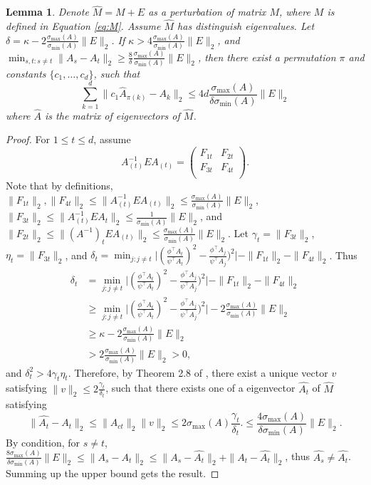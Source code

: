 \documentclass[english]{article} %
\providecommand{\lemmaname}{Lemma}
\providecommand{\lemmaname}{Lemma}
\theoremstyle{plain}
\theoremstyle{remark}
\theoremstyle{claim}
\theoremstyle{plain}
\newtheorem{lemma}[thm]{\protect\lemmaname}
\begin{document}
\begin{lemma}
\label{lem:eigenvectorvariation}
Denote $\widehat{M} = M+E$ as a perturbation of matrix $M$, where $M$ is defined in Equation \eqref{eq:M}. 
Assume $\widehat{M}$ has distinguish eigenvalues. Let $\delta = \kappa -  2 \frac{\sigma_{\max}(A)}{\sigma_{\min}(A)}\|E\|_2$. 
If $\kappa > 4 \frac{\sigma_{\max}(A)}{\sigma_{\min}(A)}\|E\|_2$, and $\min_{s,t:s\neq t} \|A_s - A_t\|_2 \ge \frac{8}{\delta}\frac{\sigma_{\max}(A)}{\sigma_{\min}(A) } \|E\|_2$, then there exist a permutation $\pi$ and constants $\{c_1,\ldots,c_d\}$, such that 
\[
\sum_{k=1}^{d}\| c_1\widehat{A}_{\pi(k)} - A_k\|_2 \le 4d  \frac{\sigma_{\max}(A)}{\delta \sigma_{\min}(A) } \|E\|_2
\]
where $\widehat{A}$ is the matrix of eigenvectors of $\widehat{M}$. 
\end{lemma}

\begin{proof}
For $1\le t\le d$, assume 
\[
A_{(t)}^{-1} E A_{(t)} =  
\left(
\begin{array}{cc}
F_{1t} & F_{2t}\\
F_{3t} & F_{4t} \\
\end{array} 
\right). 
\] 
Note that by definitions, $\|F_{1t}\|_2,\|F_{4t}\|_2\le\|A_{(t)}^{-1} E A_{(t)}\|_2\le\frac{\sigma_{\max}(A)}{\sigma_{\min}(A)}\|E\|_2$,
 $\|F_{3t}\|_2\le\|A_{(t)}^{-1}EA_{t}\|_2\le\frac{1}{\sigma_{\min}(A)}\|E\|_2$,
 and $\|F_{2t}\|_2\le\|(A^{-1})_tEA_{(t)}\|_2\le\frac{\sigma_{\max}(A)}{\sigma_{\min}(A)}\|E\|_2$.
Let $\gamma_t = \|F_{3t}\|_2$, $\eta_t = \|F_{3t}\|_2$, and $\delta_t = \min_{j: j\neq t} \vert (\frac{\phi^{\top}A_t}{\psi^{\top}A_t})^2 - \frac{\phi^{\top}A_j}{\psi^{\top}A_j})^2 \vert - \|F_{1t}\|_2 - \|F_{4t}\|_2$. Thus 
\begin{align*}
\delta_t & = \min_{j:j\neq t} \vert (\frac{\phi^{\top}A_t}{\psi^{\top}A_t})^2 - \frac{\phi^{\top}A_j}{\psi^{\top}A_j})^2 \vert - \|F_{1t}\|_2 - \|F_{4t}\|_2\\
	& \ge \min_{j:j\neq t} \vert (\frac{\phi^{\top}A_t}{\psi^{\top}A_t})^2 - \frac{\phi^{\top}A_j}{\psi^{\top}A_j})^2 \vert - 2 \frac{\sigma_{\max}(A)}{\sigma_{\min}(A)}\|E\|_2\\
	& \ge  \kappa -  2 \frac{\sigma_{\max}(A)}{\sigma_{\min}(A)}\|E\|_2\\
	& >  2 \frac{\sigma_{\max}(A)}{\sigma_{\min}(A)}\|E\|_2 >0,
\end{align*}
and $\delta_t^2 > 4\gamma_t\eta_t$. 
Therefore, by Theorem 2.8 of \citep{stewart1990matrix}, there exist a unique vector $v$ satisfying $\|v\|_2\le 2\frac{\gamma_t}{\delta_t}$, such that there exists one of a eigenvector $\widehat{A_t}$ of $\widehat{M}$ satisfying
 \[
 \|\widehat{A_t} - A_t\|_2 \le \|A_{ct}\|_2 \|v\|_2 \le 2\sigma_{\max}(A)\frac{\gamma_t}{\delta_t}.\le \frac{4\sigma_{\max}(A)}{\delta \sigma_{\min}(A) } \|E\|_2.
 \]
 By condition, for $s\neq t$,  $\frac{8\sigma_{\max}(A)}{\delta \sigma_{\min}(A) } \|E\|_2 \le \|A_s - A_t\|_2\le \|A_s - \widehat{A_t}\|_2 + \|A_t - \widehat{A_t}\|_2$, thus $\widehat{A_s} \neq \widehat{A_t}$.  Summing up the upper bound gets the result. 
\end{proof}
\end{document}

